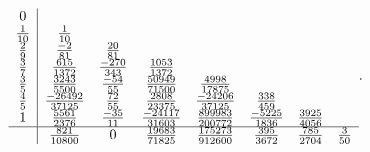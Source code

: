 \documentclass[landscape,letterpaper,10pt,english]{article}
\begin{document}
\[\begin{array}{c|ccccccc}
    0 & \\
    \frac{1}{10} & \frac{1}{10} & \\
    \frac{2}{9} & \frac{-2}{81} & \frac{20}{81} & \\
    \frac{3}{7} & \frac{615}{1372} & \frac{-270}{343} & \frac{1053}{1372} & \\
    \frac{3}{5} & \frac{3243}{5500} & \frac{-54}{55} & \frac{50949}{71500} & \frac{4998}{17875} & \\
    \frac{4}{5} & \frac{-26492}{37125} & \frac{72}{55} & \frac{2808}{23375} & \frac{-24206}{37125} & \frac{338}{459} & \\
    1 & \frac{5561}{2376} & \frac{-35}{11} & \frac{-24117}{31603} & \frac{899983}{200772} & \frac{-5225}{1836} & \frac{3925}{4056} & \\ \hline
     & \frac{821}{10800} & 0 & \frac{19683}{71825} & \frac{175273}{912600} & \frac{395}{3672} & \frac{785}{2704} & \frac{3}{50}
\end{array}.\]
\end{document}
